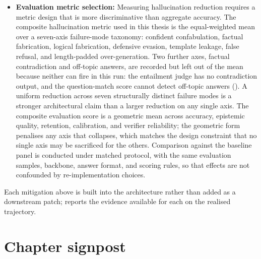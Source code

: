 \begin{itemize}
    \item \textbf{Evaluation metric selection:} Measuring hallucination reduction requires a metric design that is more discriminative than aggregate accuracy. The composite hallucination metric used in this thesis is the equal-weighted mean over a seven-axis failure-mode taxonomy: confident confabulation, factual fabrication, logical fabrication, defensive evasion, template leakage, false refusal, and length-padded over-generation. Two further axes, factual contradiction and off-topic answers, are recorded but left out of the mean because neither can fire in this run: the entailment judge has no contradiction output, and the question-match score cannot detect off-topic answers (). A uniform reduction across seven structurally distinct failure modes is a stronger architectural claim than a larger reduction on any single axis. The composite evaluation score is a geometric mean across accuracy, epistemic quality, retention, calibration, and verifier reliability; the geometric form penalises any axis that collapses, which matches the design constraint that no single axis may be sacrificed for the others. Comparison against the baseline panel is conducted under matched protocol, with the same evaluation samples, backbone, answer format, and scoring rules, so that effects are not confounded by re-implementation choices.
\end{itemize}

Each mitigation above is built into the architecture rather than added as a downstream patch;  reports the evidence available for each on the realised trajectory.

\section{Chapter signpost}
\label{sec:ch1-signpost}

